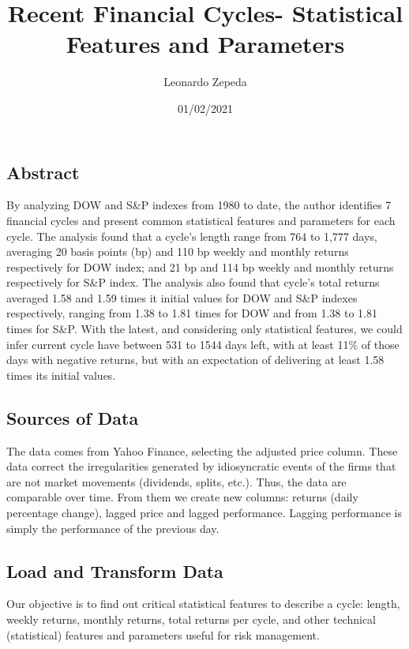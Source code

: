 \documentclass[
]{article}
\title{Recent Financial Cycles- Statistical Features and Parameters}
\author{Leonardo Zepeda}
\date{01/02/2021}
\begin{document}
\maketitle

\hypertarget{abstract}{%
\subsection{Abstract}\label{abstract}}

By analyzing DOW and S\&P indexes from 1980 to date, the author
identifies 7 financial cycles and present common statistical features
and parameters for each cycle. The analysis found that a cycle's length
range from 764 to 1,777 days, averaging 20 basis points (bp) and 110 bp
weekly and monthly returns respectively for DOW index; and 21 bp and 114
bp weekly and monthly returns respectively for S\&P index. The analysis
also found that cycle's total returns averaged 1.58 and 1.59 times it
initial values for DOW and S\&P indexes respectively, ranging from 1.38
to 1.81 times for DOW and from 1.38 to 1.81 times for S\&P. With the
latest, and considering only statistical features, we could infer
current cycle have between 531 to 1544 days left, with at least 11\% of
those days with negative returns, but with an expectation of delivering
at least 1.58 times its initial values.

\hypertarget{sources-of-data}{%
\subsection{Sources of Data}\label{sources-of-data}}

The data comes from Yahoo Finance, selecting the adjusted price column.
These data correct the irregularities generated by idiosyncratic events
of the firms that are not market movements (dividends, splits, etc.).
Thus, the data are comparable over time. From them we create new
columns: returns (daily percentage change), lagged price and lagged
performance. Lagging performance is simply the performance of the
previous day.

\hypertarget{load-and-transform-data}{%
\subsection{Load and Transform Data}\label{load-and-transform-data}}

Our objective is to find out critical statistical features to describe a
cycle: length, weekly returns, monthly returns, total returns per cycle,
and other technical (statistical) features and parameters useful for
risk management.
\end{document}
